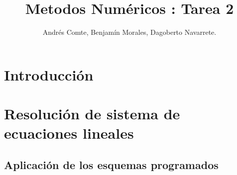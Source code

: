 \documentclass{udpreport}
\title{Metodos Numéricos : Tarea 2}
\author{Andrés Comte, Benjamín Morales, Dagoberto Navarrete.}
\begin{document}
\maketitle
\tableofcontents
\listoffigures
\chapter{Introducción}

\newpage

\chapter{Resolución de sistema de ecuaciones lineales}
	
 \section{Aplicación de los esquemas programados}
\end{document}
